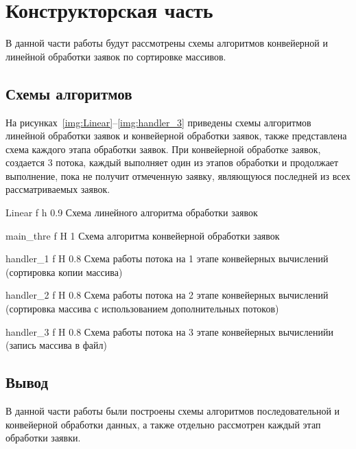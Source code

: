 \chapter{Конструкторская часть}
В данной части работы будут рассмотрены схемы алгоритмов конвейерной и линейной обработки заявок по сортировке массивов.







\section{Схемы алгоритмов}
На рисунках~\ref{img:Linear}--\ref{img:handler_3} приведены схемы алгоритмов линейной обработки заявок и конвейерной обработки заявок, также представлена схема
каждого этапа обработки заявок. При конвейерной обработке заявок, создается 3 потока, каждый выполняет один из этапов обработки и продолжает выполнение, пока не получит отмеченную заявку, являющуюся последней из всех рассматриваемых заявок.

{Linear} %
{f} %
{h} %
{0.9\textwidth} %
{Схема линейного алгоритма обработки заявок} %



{main_thre} %
{f} %
{H} %
{1\textwidth} %
{Схема алгоритма конвейерной обработки заявок} %


{handler_1} %
{f} %
{H} %
{0.8\textwidth} %
{Схема работы потока на 1 этапе конвейерных вычислений (сортировка копии массива)} %

{handler_2} %
{f} %
{H} %
{0.8\textwidth} %
{Схема работы потока на 2 этапе конвейерных вычислений (сортировка массива с использованием дополнительных потоков)} %

{handler_3} %
{f} %
{H} %
{0.8\textwidth} %
{Схема работы потока на 3 этапе конвейерных вычисленийи (запись массива в файл)} %






\section*{Вывод}
В данной части работы были построены схемы алгоритмов последовательной и конвейерной обработки данных, а также отдельно рассмотрен каждый этап обработки заявки.









